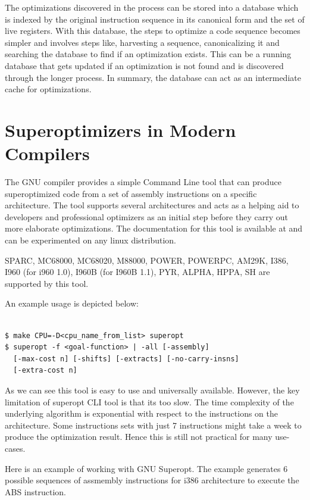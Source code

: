 \documentclass[sigconf]{acmart}
\begin{document}
The optimizations discovered in the process can be stored into a database which is indexed by the original instruction sequence in its canonical form and the set of live registers. With this database, the steps to optimize a code sequence becomes simpler and involves steps like, harvesting a sequence, canonicalizing it and searching the database to find if an optimization exists. This can be a running database that gets updated if an optimization is not found and is discovered through the longer process. In summary, the database can act as an intermediate cache for optimizations. 

\section{Superoptimizers in Modern Compilers}

The GNU compiler provides a simple Command Line tool that can produce superoptimized code from a set of assembly instructions on a specific architecture. The tool supports several architectures and acts as a helping aid to developers and professional optimizers as an initial step before they carry out more elaborate optimizations. The documentation for this tool is available at \cite{gnu} and can be experimented on any linux distribution. 

SPARC, MC68000, MC68020, M88000, POWER, POWERPC, AM29K, I386, I960 (for i960 1.0), I960B (for I960B 1.1), PYR, ALPHA, HPPA, SH are supported by this tool.

An example usage is depicted below:

\begin{verbatim}

$ make CPU=-D<cpu_name_from_list> superopt
$ superopt -f <goal-function> | -all [-assembly] 
  [-max-cost n] [-shifts] [-extracts] [-no-carry-insns] 
  [-extra-cost n]

\end{verbatim}

As we can see this tool is easy to use and universally available. However, the key limitation of superopt CLI tool is that its too slow. The time complexity of the underlying algorithm is exponential with respect to the instructions on the architecture. Some instructions sets with just 7 instructions might take a week to produce the optimization result. Hence this is still not practical for many use-cases.

Here is an example of working with GNU Superopt. The example generates 6 possible sequences of assmembly instructions for i386 architecture to execute the ABS instruction.
\end{document}
